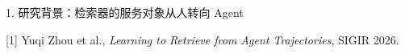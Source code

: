 \begin{frame}{1. 研究背景：检索器的服务对象从人转向 Agent}
    \vspace{-1mm}
    {\centering\tiny\textcolor{mutedGray}{[1] Yuqi Zhou et al., \textit{Learning to Retrieve from Agent Trajectories}, SIGIR 2026.}\par}
    \vspace{-1mm}
    \begin{center}
    \end{center}
\end{frame}
